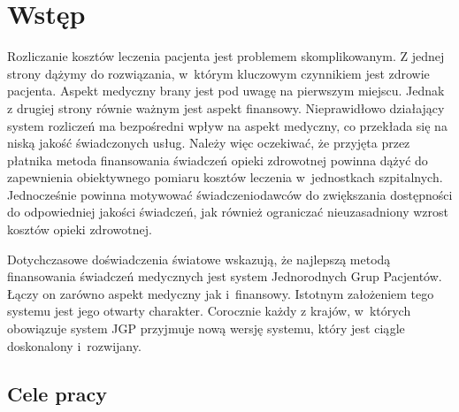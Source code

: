 \chapter{Wstęp}
\label{cha:wstep}

Rozliczanie kosztów leczenia pacjenta jest problemem skomplikowanym. Z jednej strony dążymy do rozwiązania, w~którym kluczowym czynnikiem jest zdrowie pacjenta. Aspekt medyczny brany jest pod uwagę na pierwszym miejscu. Jednak z drugiej strony równie ważnym jest aspekt finansowy. Nieprawidłowo działający system rozliczeń ma bezpośredni wpływ na aspekt medyczny, co przekłada się na niską jakość świadczonych usług\cite{kozierkiewicz_jgp}. Należy więc oczekiwać, że przyjęta przez płatnika metoda finansowania świadczeń opieki zdrowotnej powinna dążyć do zapewnienia obiektywnego pomiaru kosztów leczenia w~jednostkach szpitalnych. Jednocześnie powinna motywować świadczeniodawców do zwiększania dostępności do odpowiedniej jakości świadczeń, jak również ograniczać nieuzasadniony wzrost kosztów opieki zdrowotnej.

Dotychczasowe doświadczenia światowe wskazują, że najlepszą metodą finansowania świadczeń medycznych jest system Jednorodnych Grup Pacjentów\cite{kozierkiewicz_jgp}. Łączy on zarówno aspekt medyczny jak i~finansowy. Istotnym założeniem tego systemu jest jego otwarty charakter. Corocznie każdy z krajów, w~których obowiązuje system JGP przyjmuje nową wersję systemu, który jest ciągle doskonalony i~rozwijany.


\section{Cele pracy}
\label{sec:celePracy}

